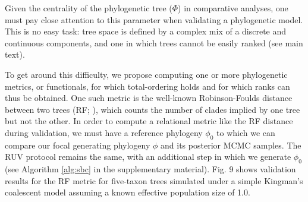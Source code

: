 \documentclass[oneside]{article}
\begin{document}
\begin{tcolorbox}[breakable, width=\textwidth, colback=gray!10, boxrule=0pt, title=Box 2: Validating a phylogenetic model with respect to its phylogenetic tree parameter, fonttitle=\bfseries]
  \small 

  Given the centrality of the phylogenetic tree ($\Phi$) in comparative analyses, one must pay close attention to this parameter when validating a phylogenetic model.
  This is no easy task: tree space is defined by a complex mix of a discrete and continuous components, and one in which trees cannot be easily ranked (see main text).

  \vspace{.25cm}

  To get around this difficulty, we propose computing one or more phylogenetic metrics, or functionals, for which total-ordering holds and for which ranks can thus be obtained.
  One such metric is the well-known Robinson-Foulds distance between two trees (RF; \citealp{rf81}), which counts the number of clades implied by one tree but not the other.
  In order to compute a relational metric like the RF distance during validation, we must have a reference phylogeny $\phi_0$ to which we can compare our focal generating phylogeny $\phi$ and its posterior MCMC samples.
  The RUV protocol remains the same, with an additional step in which we generate $\phi_0$ (see Algorithm \ref{alg:sbc} in the supplementary material).
  Fig. 9 shows validation results for the RF metric for five-taxon trees simulated under a simple Kingman's coalescent model assuming a known effective population size of 1.0.


\end{tcolorbox}
\end{document}

